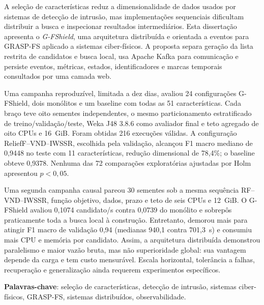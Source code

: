 \begin{resumo}[Resumo]

A seleção de características reduz a dimensionalidade de dados usados por sistemas de detecção de intrusão, mas implementações sequenciais dificultam distribuir a busca e inspecionar resultados intermediários. Esta dissertação apresenta o \textit{G-FShield}, uma arquitetura distribuída e orientada a eventos para GRASP-FS aplicado a sistemas ciber-físicos. A proposta separa geração da lista restrita de candidatos e busca local, usa Apache Kafka para comunicação e persiste eventos, métricas, estados, identificadores e marcas temporais consultados por uma camada web.

Uma campanha reproduzível, limitada a dez dias, avaliou 24 configurações G-FShield, dois monólitos e um baseline com todas as 51 características. Cada braço teve oito sementes independentes, o mesmo particionamento estratificado de treino/validação/teste, Weka J48 3.8.6 como avaliador final e teto agregado de oito CPUs e 16~GiB. Foram obtidas 216 execuções válidas. A configuração ReliefF--VND--IWSSR, escolhida pela validação, alcançou F1 macro mediano de 0,9448 no teste com 11 características, redução dimensional de 78,4\%; o baseline obteve 0,9378. Nenhuma das 72 comparações exploratórias ajustadas por Holm apresentou $p<0{,}05$.

Uma segunda campanha causal pareou 30 sementes sob a mesma sequência RF--VND--IWSSR, função objetivo, dados, prazo e teto de seis CPUs e 12~GiB. O G-FShield avaliou 0,1074 candidato/s contra 0,0739 do monólito e sobrepôs praticamente toda a busca local à construção. Entretanto, demorou mais para atingir F1 macro de validação 0,94 (medianas 940,1 contra 701,3~s) e consumiu mais CPU e memória por candidato. Assim, a arquitetura distribuída demonstrou paralelismo e maior vazão bruta, mas não superioridade global: sua vantagem depende da carga e tem custo mensurável. Escala horizontal, tolerância a falhas, recuperação e generalização ainda requerem experimentos específicos.

\noindent
\textbf{Palavras-chave}: seleção de características, detecção de intrusão, sistemas ciber-físicos, GRASP-FS, sistemas distribuídos, observabilidade.

\end{resumo}
